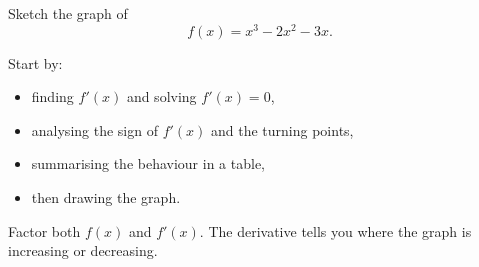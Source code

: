 \begin{problem}
Sketch the graph of
\[
f(x)=x^3-2x^2-3x.
\]

Start by:
\begin{itemize}[leftmargin=*]
\item finding $f'(x)$ and solving $f'(x)=0$,
\item analysing the sign of $f'(x)$ and the turning points,
\item summarising the behaviour in a table,
\item then drawing the graph.
\end{itemize}
\end{problem}

\begin{hintbox}
Factor both $f(x)$ and $f'(x)$. The derivative tells you where the graph is increasing or decreasing.
\end{hintbox}

